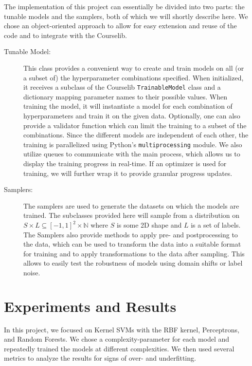 \documentclass[11pt]{article}
\begin{document}
The implementation of this project can essentially be divided into two parts: the tunable models and the samplers, both of which we will shortly describe here. We chose an object-oriented approach
to allow for easy extension and reuse of the code and to integrate with the Courselib.
\begin{description}
    \item[Tunable Model:] This class provides a convenient way to create and train models on all (or a subset of) the hyperparameter combinations specified. When initialized, it receives
        a subclass of the Courselib \texttt{TrainableModel} class and a dictionary mapping parameter names to their possible values. When training the model, it will instantiate a model
        for each combination of hyperparameters and train it on the given data. Optionally, one can also provide a validator function which can limit the training to a subset of the
        combinations. Since the different models are independent of each other, the training is parallelized using Python's \texttt{multiprocessing} module. We also utilize queues to
        communicate with the main process, which allows us to display the training progress in real-time. If an optimizer is used for training, we will further wrap it to provide
        granular progress updates.
    \item[Samplers:] The samplers are used to generate the datasets on which the models are trained. The subclasses provided here will sample from a distribution on $S\times L\subseteq [-1, 1]^2\times \mathbb{N}$
        where $S$ is some 2D shape and $L$ is a set of labels. The Samplers also provide methods to apply pre- and postprocessing to the data, which can be used to transform the data into a suitable format for training
        and to apply transformations to the data after sampling. This allows to easily test the robustness of models using domain shifts or label noise.
\end{description}

\section{Experiments and Results}

In this project, we focused on Kernel SVMs with the RBF kernel, Perceptrons, and Random Forests. We chose a complexity-parameter for each model and repeatedly trained the models
at different complexities. We then used several metrics to analyze the results for signs of over- and underfitting.
\end{document}
